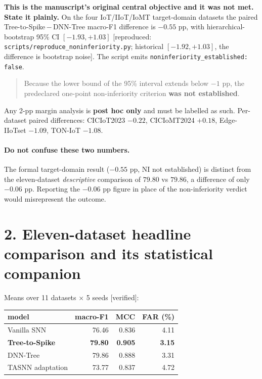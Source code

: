 \textbf{This is the manuscript's original central objective and it was not met. State it
plainly.} On the four IoT/IIoT/IoMT target-domain datasets the paired
Tree-to-Spike\,$-$\,DNN-Tree macro-F1 difference is $\mathbf{-0.55}$ pp, with
hierarchical-bootstrap 95\% CI $\mathbf{[-1.93, +1.03]}$
\textup{[reproduced: \texttt{scripts/reproduce\_noninferiority.py}; historical
$[-1.92,+1.03]$, the difference is bootstrap noise]}. The script emits
\texttt{noninferiority\_established: false}.

\begin{quote}
Because the lower bound of the 95\% interval extends below $-1$ pp, the predeclared
one-point non-inferiority criterion \textbf{was not established}.
\end{quote}

\noindent Any 2-pp margin analysis is \textbf{post hoc only} and must be labelled as such.
Per-dataset paired differences: CICIoT2023 $-0.22$, CICIoMT2024 $+0.18$, Edge-IIoTset
$-1.09$, TON-IoT $-1.08$.

\paragraph{$\!$Do not confuse these two numbers.} The formal target-domain result
($-0.55$ pp, NI not established) is distinct from the eleven-dataset \emph{descriptive}
comparison of $79.80$ vs $79.86$, a difference of only $\mathbf{-0.06}$ pp. Reporting the
$-0.06$ pp figure in place of the non-inferiority verdict would misrepresent the outcome.

\section*{2. Eleven-dataset headline comparison and its statistical companion}

Means over 11 datasets $\times$ 5 seeds \textup{[verified]}:

\begin{center}\small
\begin{tabular}{lrrr}\toprule
model & macro-F1 & MCC & FAR (\%) \\\midrule
Vanilla SNN            & 76.46 & 0.836 & 4.11 \\
\textbf{Tree-to-Spike} & \textbf{79.80} & \textbf{0.905} & \textbf{3.15} \\
DNN-Tree               & 79.86 & 0.888 & 3.31 \\
TASNN adaptation       & 73.77 & 0.837 & 4.72 \\
\bottomrule\end{tabular}\end{center}


